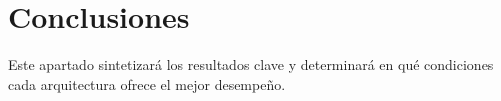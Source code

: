 \section{Conclusiones}

Este apartado sintetizará los resultados clave y determinará en qué condiciones cada arquitectura ofrece el mejor desempeño.
